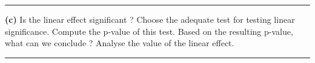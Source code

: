 \documentclass[10pt, a4paper, nofootinbib]{scrartcl}
\begin{document}
\begin{center}\rule{6cm}{0.4pt}\end{center}

\textbf{(c)} Is the linear effect significant ? Choose the adequate test for testing linear significance. Compute the p-value of this test. Based on the resulting p-value, what can we conclude ? Analyse the value of the linear effect.

\begin{center}\rule{6cm}{0.4pt}\end{center}
\end{document}
